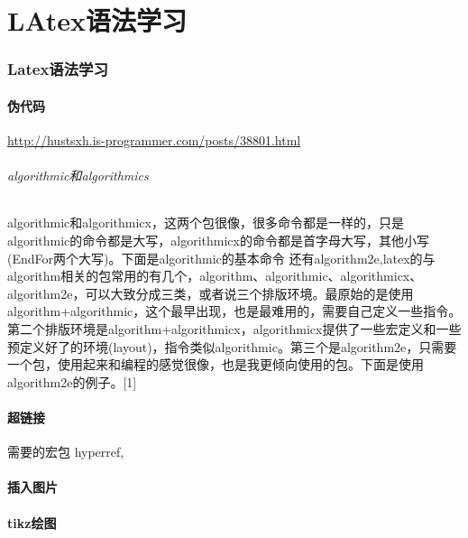\part{LAtex语法学习}
\section{Latex语法学习}
\subsection{伪代码}
\href{伪代码}{http://hustsxh.is-programmer.com/posts/38801.html}
\paragraph{algorithmic和algorithmics}
algorithmic和algorithmicx，这两个包很像，很多命令都是一样的，只是algorithmic的命令都是大写，algorithmicx的命令都是首字母大写，其他小写(EndFor两个大写)。下面是algorithmic的基本命令
还有algorithm2e,latex的与algorithm相关的包常用的有几个，algorithm、algorithmic、algorithmicx、algorithm2e，可以大致分成三类，或者说三个排版环境。最原始的是使用algorithm+algorithmic，这个最早出现，也是最难用的，需要自己定义一些指令。第二个排版环境是algorithm+algorithmicx，algorithmicx提供了一些宏定义和一些预定义好了的环境(layout)，指令类似algorithmic。第三个是algorithm2e，只需要一个包，使用起来和编程的感觉很像，也是我更倾向使用的包。下面是使用algorithm2e的例子。[1]
\subsection{超链接}
需要的宏包 hyperref, 

\subsection{插入图片}

\subsection{tikz绘图}
\newpage
{}

